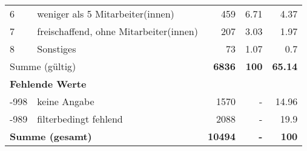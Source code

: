 \begin{longtable}{lXrrr}
     6 &
     \multicolumn{1}{X}{ weniger als 5 Mitarbeiter(innen)   } &


       \num{459} &
       \num[round-mode=places,round-precision=2]{6.71} &
         \num[round-mode=places,round-precision=2]{4.37} \\

     7 &
     \multicolumn{1}{X}{ freischaffend, ohne Mitarbeiter(innen)   } &


       \num{207} &
       \num[round-mode=places,round-precision=2]{3.03} &
         \num[round-mode=places,round-precision=2]{1.97} \\

     8 &
     \multicolumn{1}{X}{ Sonstiges   } &


       \num{73} &
       \num[round-mode=places,round-precision=2]{1.07} &
         \num[round-mode=places,round-precision=2]{0.7} \\
     \midrule
     \multicolumn{2}{l}{Summe (gültig)} &
       \textbf{\num{6836}} &
     \textbf{\num{100}} &
       \textbf{\num[round-mode=places,round-precision=2]{65.14}} \\
     \multicolumn{5}{l}{\textbf{Fehlende Werte}}\\
       -998 &
       keine Angabe &
         \num{1570} &
        - &
         \num[round-mode=places,round-precision=2]{14.96} \\
       -989 &
       filterbedingt fehlend &
         \num{2088} &
        - &
         \num[round-mode=places,round-precision=2]{19.9} \\
     \midrule
     \multicolumn{2}{l}{\textbf{Summe (gesamt)}} &
          \textbf{\num{10494}} &
        \textbf{-} &
        \textbf{\num{100}} \\
     \bottomrule
     \end{longtable}
     
